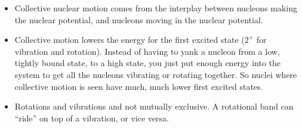 \documentclass[letter]{article}
\begin{document}
\begin{itemize}
\item Collective nuclear motion comes from the interplay between
  nucleons making the nuclear potential, and nucleons moving in the
  nuclear potential.~\cite[Lec. 13-16]{lecture}
\item Collective motion lowers the energy for the first excited state
  ($2^+$ for vibration and rotation). Instead of having to yank
  a nucleon from a low, tightly bound state, to a high state, you just
  put enough energy into the system to get all the nucleons vibrating
  or rotating together. So nuclei where collective motion is seen have
  much, much lower first excited states.
\item Rotations and vibrations and not mutually
  exclusive. A rotational band can ``ride'' on top of a vibration, or
  vice versa.
\end{itemize}
\end{document}
